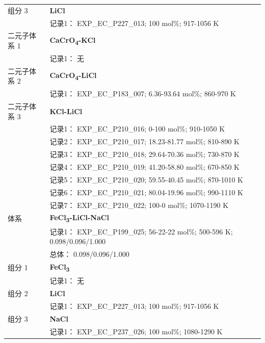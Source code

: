 \documentclass[12pt]{article}
\begin{document}
{\begin{longtable}[]{@{}
  >{\raggedright\arraybackslash}p{}
  >{\raggedright\arraybackslash}p{}@{}}
组分 3  & \textbf{LiCl} \\
 & 记录1： EXP\_EC\_P227\_013; 100 mol\%; 917-1056 K  \\

二元子体系 1 & \textbf{CaCrO\textsubscript{4}-KCl} \\
 & 记录1： 无 \\
二元子体系 2  & \textbf{CaCrO\textsubscript{4}-LiCl} \\
 & 记录1： EXP\_EC\_P183\_007; 6.36-93.64 mol\%; 860-970 K  \\

二元子体系 3  & \textbf{KCl-LiCl} \\
 & 记录1： EXP\_EC\_P210\_016; 0-100 mol\%; 910-1050 K \\
 & 记录2： EXP\_EC\_P210\_017; 18.23-81.77 mol\%; 810-890 K \\
 & 记录3： EXP\_EC\_P210\_018; 29.64-70.36 mol\%; 730-870 K \\
 & 记录4： EXP\_EC\_P210\_019; 41.20-58.80 mol\%; 670-850 K \\
 & 记录5： EXP\_EC\_P210\_020; 59.55-40.45 mol\%; 870-1010 K \\
 & 记录6： EXP\_EC\_P210\_021; 80.04-19.96 mol\%; 990-1110 K \\
 & 记录7： EXP\_EC\_P210\_022; 100-0 mol\%; 1070-1190 K  \\

\midrule
体系 & \textbf{FeCl\textsubscript{3}-LiCl-NaCl} \\
 & 记录1： EXP\_EC\_P199\_025; 56-22-22 mol\%; 500-596 K; 0.098/0.096/1.000 \\
 & 总体： 0.098/0.096/1.000  \\

组分 1 & \textbf{FeCl\textsubscript{3}} \\
 & 记录1： 无 \\
组分 2  & \textbf{LiCl} \\
 & 记录1： EXP\_EC\_P227\_013; 100 mol\%; 917-1056 K  \\

组分 3  & \textbf{NaCl} \\
 & 记录1： EXP\_EC\_P237\_026; 100 mol\%; 1080-1290 K  \\


\end{longtable}}
\end{document}
